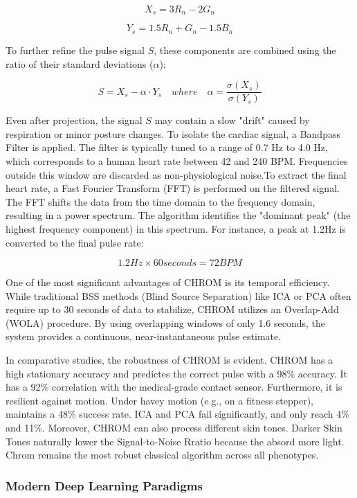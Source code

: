 $$X_s = 3R_n - 2G_n$$

$$Y_s = 1.5R_n + G_n - 1.5B_n$$

To further refine the pulse signal $S$, these components are combined using the ratio of their standard deviations ($\alpha$):

$$S = X_s - \alpha \cdot Y_s \quad where \quad \alpha = \frac{\sigma(X_s)}{\sigma(Y_s)}$$

Even after projection, the signal $S$ may contain a slow "drift" caused by respiration or minor posture changes. To isolate the cardiac signal, a Bandpass Filter is applied. The filter is typically tuned to a range of 0.7 Hz to 4.0 Hz, which corresponds to a human heart rate between 42 and 240 BPM. Frequencies outside this window are discarded as non-physiological noise.To extract the final heart rate, a Fast Fourier Transform (FFT) is performed on the filtered signal. The FFT shifts the data from the time domain to the frequency domain, resulting in a power spectrum. The algorithm identifies the "dominant peak" (the highest frequency component) in this spectrum. For instance, a peak at 1.2Hz is converted to the final pulse rate:

$$1.2 Hz \times 60 seconds = 72 BPM$$


One of the most significant advantages of CHROM is its temporal efficiency. While traditional BSS methods (Blind Source Separation) like ICA or PCA often require up to 30 seconds of data to stabilize, CHROM utilizes an Overlap-Add (WOLA) procedure. By using overlapping windows of only 1.6 seconds, the system provides a continuous, near-instantaneous pulse estimate.

In comparative studies, the robustness of CHROM is evident. CHROM has a high stationary accuracy and predictes the correct pulse with a 98\% accuracy. It has a 92\% correlation with the medical-grade contact sensor. Furthermore, it is resilient against motion. Under havey motion (e.g., on a fitness stepper), maintains a 48\% success rate. ICA and PCA fail significantly, and only reach 4\% and 11\%. Moreover, CHROM can also process different skin tones. Darker Skin Tones naturally lower the Signal-to-Noise Rratio because the absord more light. Chrom remains the most robust classical algorithm across all phenotypes.

\subsubsection{Modern Deep Learning Paradigms}

